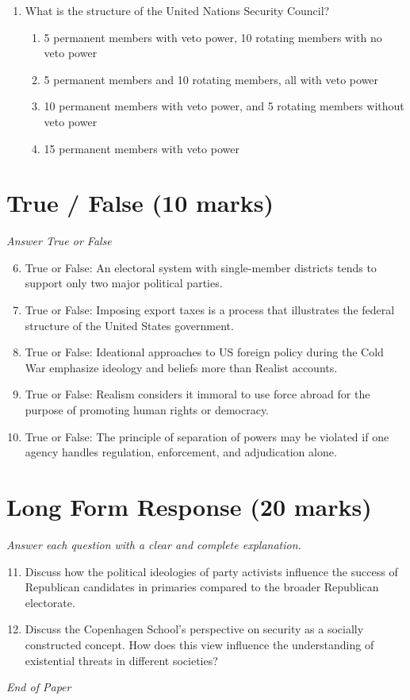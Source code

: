 \documentclass[12pt]{article}
\begin{document}
\begin{enumerate}[label=\arabic*.]
\begin{enumerate}[label=(\alph*)]
    \item Jimmy Carter
    \item Ronald Reagan
    \item Bill Clinton
    \item Dwight Eisenhower
\end{enumerate}
\item What is the structure of the United Nations Security Council?
\begin{enumerate}[label=(\alph*)]
    \item 5 permanent members with veto power, 10 rotating members with no veto power
    \item 5 permanent members and 10 rotating members, all with veto power
    \item 10 permanent members with veto power, and 5 rotating members without veto power
    \item 15 permanent members with veto power
\end{enumerate}
\end{enumerate}

\section*{True / False (10 marks)}
\textit{Answer True or False}
\begin{enumerate}[label=\arabic*.]
\setcounter{enumi}{5}
\item True or False: An electoral system with single-member districts tends to support only two major political parties.
\item True or False: Imposing export taxes is a process that illustrates the federal structure of the United States government.
\item True or False: Ideational approaches to US foreign policy during the Cold War emphasize ideology and beliefs more than Realist accounts.
\item True or False: Realism considers it immoral to use force abroad for the purpose of promoting human rights or democracy.
\item True or False: The principle of separation of powers may be violated if one agency handles regulation, enforcement, and adjudication alone.
\end{enumerate}

\section*{Long Form Response (20 marks)}
\textit{Answer each question with a clear and complete explanation.}
\begin{enumerate}[label=\arabic*.]
\setcounter{enumi}{10}
\item Discuss how the political ideologies of party activists influence the success of Republican candidates in primaries compared to the broader Republican electorate.
\item Discuss the Copenhagen School's perspective on security as a socially constructed concept. How does this view influence the understanding of existential threats in different societies?
\end{enumerate}

\vfill
\noindent\textit{End of Paper}
\end{document}
